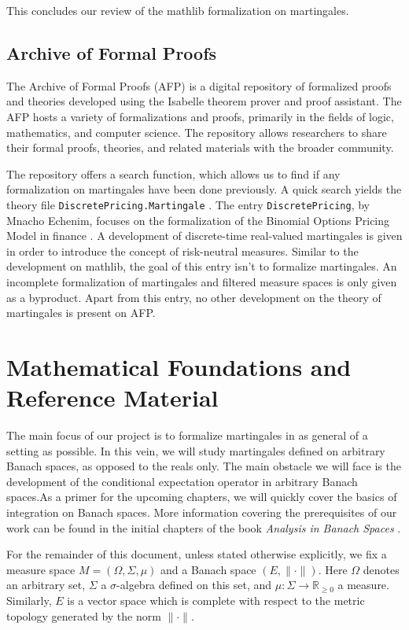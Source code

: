 This concludes our review of the \textsf{mathlib} formalization on martingales.

\subsection{Archive of Formal Proofs}

The Archive of Formal Proofs (\textsf{AFP}) is a digital repository of formalized proofs and theories developed using the Isabelle theorem prover and proof assistant. The \textsf{AFP}  hosts a variety of formalizations and proofs, primarily in the fields of logic, mathematics, and computer science. The repository allows researchers to share their formal proofs, theories, and related materials with the broader community.

The repository offers a search function, which allows us to find if any formalization on martingales have been done previously. A quick search yields the theory file \texttt{DiscretePricing.Martingale} \cite{DiscretePricing-AFP}. The entry \texttt{DiscretePricing}, by Mnacho Echenim, focuses on the formalization of the Binomial Options Pricing Model in finance \cite{EchenimPeltier}. A development of discrete-time real-valued martingales is given in order to introduce the concept of risk-neutral measures. Similar to the development on \textsf{mathlib}, the goal of this entry isn't to formalize martingales. An incomplete formalization of martingales and filtered measure spaces is only given as a byproduct.
Apart from this entry, no other development on the theory of martingales is present on \textsf{AFP}.

\section{Mathematical Foundations and Reference Material}

The main focus of our project is to formalize martingales in as general of a setting as possible. In this vein, we will study martingales defined on arbitrary Banach spaces, as opposed to the reals only. The main obstacle we will face is the development of the conditional expectation operator in arbitrary Banach spaces.As a primer for the upcoming chapters, we will quickly cover the basics of integration on Banach spaces. More information covering the prerequisites of our work can be found in the initial chapters of the book \textit{Analysis in Banach Spaces} \cite{Hytoenen_2016}.

\begin{remark}
	For the remainder of this document, unless stated otherwise explicitly, we fix a measure space $M = (\Omega, \Sigma, \mu)$ and a Banach space $(E, \lVert \cdot \rVert)$. Here $\Omega$ denotes an arbitrary set, $\Sigma$ a $\sigma$-algebra defined on this set, and $\mu : \Sigma \rightarrow \mathbb{R}_{\ge 0}$ a measure. Similarly, $E$ is a vector space which is complete with respect to the metric topology generated by the norm $\lVert \cdot \rVert$.
\end{remark}

